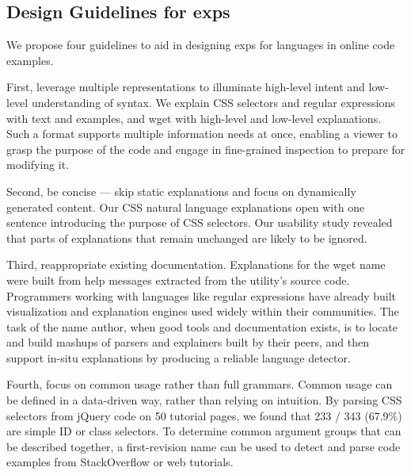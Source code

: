 \begin{changes}
\subsection{Design Guidelines for \Glspl{exp}}
We propose four guidelines to aid in designing \glspl{exp} for languages in online code examples.

First, leverage multiple representations to illuminate high-level intent and low-level understanding of syntax.
We explain CSS selectors and regular expressions with text and examples, and wget with high-level and low-level explanations.
Such a format supports multiple information needs at once, enabling a viewer to grasp the purpose of the code and engage in fine-grained inspection to prepare for modifying it.

Second, be concise --- skip static explanations and focus on dynamically generated content.
Our CSS natural language explanations open with one sentence introducing the purpose of CSS selectors.
Our usability study revealed that parts of explanations that remain unchanged are likely to be ignored. %

Third, reappropriate existing documentation.
Explanations for the wget \Gls{name} were built from help messages extracted from the utility's source code.
Programmers working with languages like regular expressions have already built visualization and explanation engines used widely within their communities.
The task of the \Gls{name} author, when good tools and documentation exists, is to locate and build mashups of parsers and explainers built by their peers, and then support in-situ explanations by producing a reliable language detector.

Fourth, focus on common usage rather than full grammars.
Common usage can be defined in a data-driven way, rather than relying on intuition.
By parsing CSS selectors from jQuery code on 50 tutorial pages, we found that 233 / 343 (67.9\%) are simple ID or class selectors.
To determine common argument groups that can be described together, a first-revision \Gls{name} can be used to detect and parse code examples from StackOverflow or web tutorials.

\end{changes}
